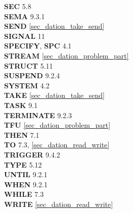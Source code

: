 {{\bf SEC} 5.8\\
{\bf SEMA} 9.3.1\\
{\bf SEND} \ref{sec_dation_take_send}\\
{\bf SIGNAL} 11\\
{\bf SPECIFY}, {\bf SPC} 4.1\\
{\bf STREAM} \ref{sec_dation_problem_part}\\
{\bf STRUCT} 5.11\\
{\bf SUSPEND} 9.2.4\\
{\bf SYSTEM} 4.2\\
 
{\bf TAKE} \ref{sec_dation_take_send}\\
{\bf TASK} 9.1\\
{\bf TERMINATE} 9.2.3\\
{\bf TFU} \ref{sec_dation_problem_part}\\
{\bf THEN} 7.1\\
{\bf TO} 7.3, \ref{sec_dation_read_write}\\
{\bf TRIGGER} 9.4.2\\
{\bf TYPE} 5.12\\
 
{\bf UNTIL} 9.2.1\\
 
{\bf WHEN} 9.2.1\\
{\bf WHILE} 7.3\\
{\bf WRITE} \ref{sec_dation_read_write}\\
}
\onecolumn


